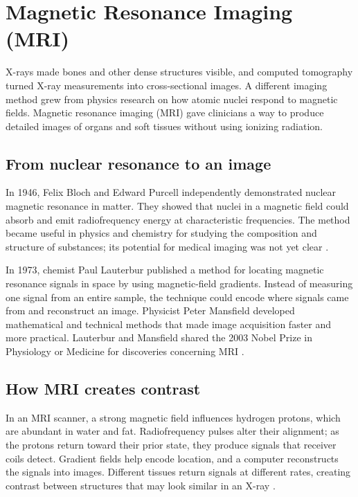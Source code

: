 \documentclass[12pt,oneside]{book}
\begin{document}
\chapter[Magnetic Resonance Imaging (MRI)]{Magnetic Resonance Imaging (MRI)}

X-rays made bones and other dense structures visible, and computed
tomography turned X-ray measurements into cross-sectional images. A
different imaging method grew from physics research on how atomic nuclei
respond to magnetic fields. Magnetic resonance imaging (MRI) gave clinicians
a way to produce detailed images of organs and soft tissues without using
ionizing radiation.

\section{From nuclear resonance to an image}
In 1946, Felix Bloch and Edward Purcell independently demonstrated nuclear
magnetic resonance in matter. They showed that nuclei in a magnetic field
could absorb and emit radiofrequency energy at characteristic frequencies.
The method became useful in physics and chemistry for studying the
composition and structure of substances; its potential for medical imaging
was not yet clear \cite{nobelBlochPurcell}.

In 1973, chemist Paul Lauterbur published a method for locating magnetic
resonance signals in space by using magnetic-field gradients. Instead of
measuring one signal from an entire sample, the technique could encode where
signals came from and reconstruct an image. Physicist Peter Mansfield
developed mathematical and technical methods that made image acquisition
faster and more practical. Lauterbur and Mansfield shared the 2003 Nobel
Prize in Physiology or Medicine for discoveries concerning MRI
\cite{lauterbur1973,nobelMRI2003}.

\section{How MRI creates contrast}
In an MRI scanner, a strong magnetic field influences hydrogen protons,
which are abundant in water and fat. Radiofrequency pulses alter their
alignment; as the protons return toward their prior state, they produce
signals that receiver coils detect. Gradient fields help encode location,
and a computer reconstructs the signals into images. Different tissues
return signals at different rates, creating contrast between structures
that may look similar in an X-ray \cite{fdaMRI}.
\end{document}
